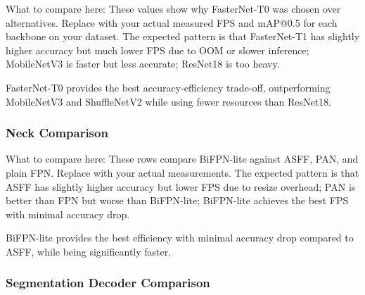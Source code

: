 \documentclass[10pt,a4paper,twocolumn]{article}
\begin{document}
What to compare here: These values show why FasterNet-T0 was chosen over alternatives. Replace with your actual measured FPS and mAP@0.5 for each backbone on your dataset. The expected pattern is that FasterNet-T1 has slightly higher accuracy but much lower FPS due to OOM or slower inference; MobileNetV3 is faster but less accurate; ResNet18 is too heavy.

FasterNet-T0 provides the best accuracy-efficiency trade-off, outperforming MobileNetV3 and ShuffleNetV2 while using fewer resources than ResNet18.

\subsubsection{Neck Comparison}

\begin{table}[htbp]
\centering
\caption{Neck architecture comparison}
\label{tab:ablation_neck}
\end{table}

What to compare here: These rows compare BiFPN-lite against ASFF, PAN, and plain FPN. Replace with your actual measurements. The expected pattern is that ASFF has slightly higher accuracy but lower FPS due to resize overhead; PAN is better than FPN but worse than BiFPN-lite; BiFPN-lite achieves the best FPS with minimal accuracy drop.

BiFPN-lite provides the best efficiency with minimal accuracy drop compared to ASFF, while being significantly faster.

\subsubsection{Segmentation Decoder Comparison}

\begin{table}[htbp]
\centering
\caption{Segmentation decoder comparison}
\label{tab:ablation_seg}
\end{table}
\end{document}
